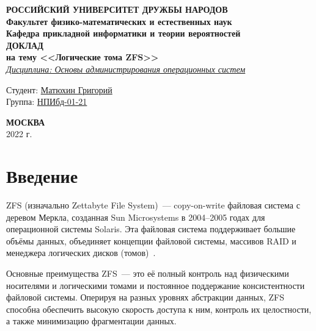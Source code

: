 \documentclass[a4page]{article}
\begin{document}


\begin{titlepage}

	\begin{center}
		\hfill \break
		\textbf{
			\large{РОССИЙСКИЙ УНИВЕРСИТЕТ ДРУЖБЫ НАРОДОВ}\\
			\normalsize{Факультет физико-математических и естественных наук}\\
			\normalsize{Кафедра прикладной информатики и теории вероятностей}\\
		}
		\vspace*{\fill}
		\Large{\textbf{ДОКЛАД\\ на тему <<Логические тома ZFS>>}}
		\\
		\underline{\textit{\normalsize{Дисциплина: Основы администрирования операционных систем}}}
		\vspace*{\fill}

	\end{center}

	\begin{flushright}
		Студент: \underline{Матюхин Григорий}\\ \vspace{0.5cm}
		Группа: \underline{НПИбд-01-21}
	\end{flushright}


	\begin{center} \textbf{МОСКВА} \\ 2022 г. \end{center}
	\thispagestyle{empty} %

\end{titlepage}

\newpage

\tableofcontents

\newpage

\section{Введение}

ZFS (изначально Zettabyte File System) — copy-on-write файловая система с деревом Меркла,
созданная Sun Microsystems в 2004–2005 годах для операционной системы Solaris.
Эта файловая система поддерживает большие объёмы данных,
объединяет концепции файловой системы, массивов RAID и менеджера логических дисков (томов)~\cite{wiki:zfs}.

Основные преимущества ZFS — это её полный контроль над физическими носителями и логическими томами
и постоянное поддержание консистентности файловой системы.
Оперируя на разных уровнях абстракции данных, ZFS способна обеспечить высокую скорость доступа к ним,
контроль их целостности, а также минимизацию фрагментации данных.
\end{document}
